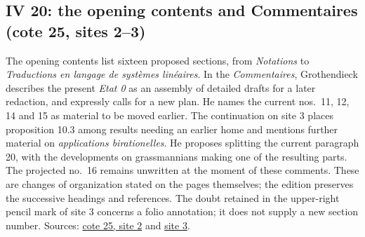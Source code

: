 \subsection*{IV 20: the opening contents and Commentaires (cote 25, sites 2--3)}
The opening contents list sixteen proposed sections, from \emph{Notations} to \emph{Traductions en langage de systèmes linéaires}. In the \emph{Commentaires}, Grothendieck describes the present \emph{Etat 0} as an assembly of detailed drafts for a later redaction, and expressly calls for a new plan. He names the current nos.\ 11, 12, 14 and 15 as material to be moved earlier. The continuation on site 3 places proposition 10.3 among results needing an earlier home and mentions further material on \emph{applications birationelles}. He proposes splitting the current paragraph 20, with the developments on grassmannians making one of the resulting parts. The projected no.\ 16 remains unwritten at the moment of these comments. These are changes of organization stated on the pages themselves; the edition preserves the successive headings and references. The doubt retained in the upper-right pencil mark of site 3 concerns a folio annotation; it does not supply a new section number. Sources: \href{https://grothendieck.umontpellier.fr/web/viewer.html?file=../25.pdf\#page=3}{cote 25, site 2} and \href{https://grothendieck.umontpellier.fr/web/viewer.html?file=../25.pdf\#page=4}{site 3}.
